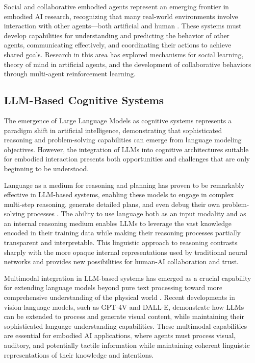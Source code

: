 Social and collaborative embodied agents represent an emerging frontier in embodied AI research, recognizing that many real-world environments involve interaction with other agents—both artificial and human \cite{breazeal2016social}. These systems must develop capabilities for understanding and predicting the behavior of other agents, communicating effectively, and coordinating their actions to achieve shared goals. Research in this area has explored mechanisms for social learning, theory of mind in artificial agents, and the development of collaborative behaviors through multi-agent reinforcement learning.

\subsection{LLM-Based Cognitive Systems}

The emergence of Large Language Models as cognitive systems represents a paradigm shift in artificial intelligence, demonstrating that sophisticated reasoning and problem-solving capabilities can emerge from language modeling objectives. However, the integration of LLMs into cognitive architectures suitable for embodied interaction presents both opportunities and challenges that are only beginning to be understood.

Language as a medium for reasoning and planning has proven to be remarkably effective in LLM-based systems, enabling these models to engage in complex multi-step reasoning, generate detailed plans, and even debug their own problem-solving processes \cite{wei2022chain}. The ability to use language both as an input modality and as an internal reasoning medium enables LLMs to leverage the vast knowledge encoded in their training data while making their reasoning processes partially transparent and interpretable. This linguistic approach to reasoning contrasts sharply with the more opaque internal representations used by traditional neural networks and provides new possibilities for human-AI collaboration and trust.

Multimodal integration in LLM-based systems has emerged as a crucial capability for extending language models beyond pure text processing toward more comprehensive understanding of the physical world \cite{li2023blip2}. Recent developments in vision-language models, such as GPT-4V and DALL-E, demonstrate how LLMs can be extended to process and generate visual content, while maintaining their sophisticated language understanding capabilities. These multimodal capabilities are essential for embodied AI applications, where agents must process visual, auditory, and potentially tactile information while maintaining coherent linguistic representations of their knowledge and intentions.

